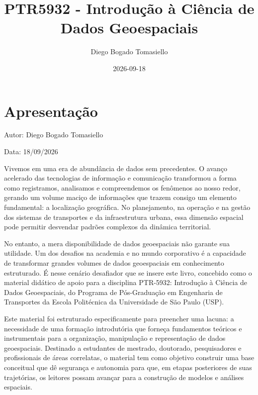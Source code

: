 \documentclass[
  letterpaper,
  DIV=11,
  numbers=noendperiod]{scrreprt}
\title{PTR5932 - Introdução à Ciência de Dados Geoespaciais}
\author{Diego Bogado Tomasiello}
\date{2026-09-18}
\renewcommand*\contentsname{Table of contents}
\newcommand\contentsname{Table of contents}
\begin{document}
\maketitle

\renewcommand*\contentsname{Table of contents}
{
\hypersetup{linkcolor=}
\setcounter{tocdepth}{2}
\tableofcontents
}


\chapter*{Apresentação}\label{apresentauxe7uxe3o}


Autor: Diego Bogado Tomasiello

Data: 18/09/2026

Vivemos em uma era de abundância de dados sem precedentes. O avanço
acelerado das tecnologias de informação e comunicação transformou a
forma como registramos, analisamos e compreendemos os fenômenos ao nosso
redor, gerando um volume maciço de informações que trazem consigo um
elemento fundamental: a localização geográfica. No planejamento, na
operação e na gestão dos sistemas de transportes e da infraestrutura
urbana, essa dimensão espacial pode permitir desvendar padrões complexos
da dinâmica territorial.

No entanto, a mera disponibilidade de dados geoespaciais não garante sua
utilidade. Um dos desafios na academia e no mundo corporativo é a
capacidade de transformar grandes volumes de dados geoespaciais em
conhecimento estruturado. É nesse cenário desafiador que se insere este
livro, concebido como o material didático de apoio para a disciplina
PTR-5932: Introdução à Ciência de Dados Geoespaciais, do Programa de
Pós-Graduação em Engenharia de Transportes da Escola Politécnica da
Universidade de São Paulo (USP).

Este material foi estruturado especificamente para preencher uma lacuna:
a necessidade de uma formação introdutória que forneça fundamentos
teóricos e instrumentais para a organização, manipulação e representação
de dados geoespaciais. Destinado a estudantes de mestrado, doutorado,
pesquisadores e profissionais de áreas correlatas, o material tem como
objetivo construir uma base conceitual que dê segurança e autonomia para
que, em etapas posteriores de suas trajetórias, os leitores possam
avançar para a construção de modelos e análises espaciais.
\end{document}
